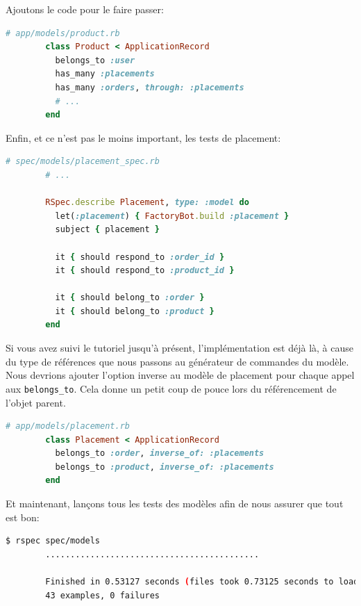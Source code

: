 \documentclass[]{report}
\begin{document}
      Ajoutons le code pour le faire passer:

      \begin{scriptsize}
        \begin{lstlisting}[language=ruby]
        # app/models/product.rb
        class Product < ApplicationRecord
          belongs_to :user
          has_many :placements
          has_many :orders, through: :placements
          # ...
        end
        \end{lstlisting}
      \end{scriptsize}

      Enfin, et ce n'est pas le moins important, les tests de placement:

      \begin{scriptsize}
        \begin{lstlisting}[language=ruby]
        # spec/models/placement_spec.rb
        # ...

        RSpec.describe Placement, type: :model do
          let(:placement) { FactoryBot.build :placement }
          subject { placement }

          it { should respond_to :order_id }
          it { should respond_to :product_id }

          it { should belong_to :order }
          it { should belong_to :product }
        end
        \end{lstlisting}
      \end{scriptsize}

      Si vous avez suivi le tutoriel jusqu'à présent, l'implémentation est déjà là, à cause du type de références que nous passons au générateur de commandes du modèle. Nous devrions ajouter l'option inverse au modèle de placement pour chaque appel aux \verb|belongs_to|. Cela donne un petit coup de pouce lors du référencement de l'objet parent.

      \begin{scriptsize}
        \begin{lstlisting}[language=ruby]
        # app/models/placement.rb
        class Placement < ApplicationRecord
          belongs_to :order, inverse_of: :placements
          belongs_to :product, inverse_of: :placements
        end
        \end{lstlisting}
      \end{scriptsize}

      Et maintenant, lançons tous les tests des modèles afin de nous assurer que tout est bon:

      \begin{scriptsize}
        \begin{lstlisting}[language=bash]
        $ rspec spec/models
        ...........................................

        Finished in 0.53127 seconds (files took 0.73125 seconds to load)
        43 examples, 0 failures
        \end{lstlisting}
      \end{scriptsize}
\end{document}
